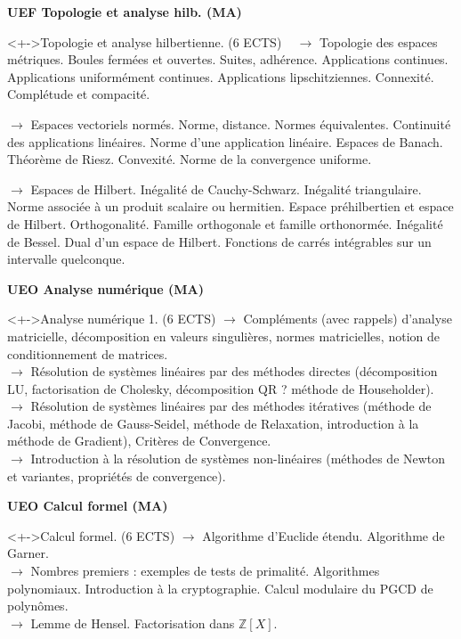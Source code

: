 \documentclass{beamer}
\begin{document}
\begin{frame}
{\bf UEF Topologie et analyse hilb. (MA)}
\begin{block}<+->{Topologie et analyse hilbertienne.  (6 ECTS) \ } 
$\to$ Topologie des espaces métriques.   Boules fermées et ouvertes. Suites,  adhérence.   Applications continues. Applications uniformément continues.
Applications lipschitziennes. Connexité. Complétude et compacité.  

$\to$ Espaces vectoriels normés. Norme, distance. Normes équivalentes.  
Continuité des applications linéaires. Norme d'une application linéaire. Espaces de Banach.
Théorème de Riesz. Convexité. Norme de la convergence uniforme.  

$\to$ Espaces de Hilbert. Inégalité de Cauchy-Schwarz. Inégalité triangulaire. Norme associée à
un produit scalaire ou hermitien. Espace préhilbertien et espace de Hilbert. Orthogonalité.
Famille orthogonale et famille orthonormée. Inégalité de Bessel. Dual d'un espace de
Hilbert. Fonctions de carrés intégrables sur un intervalle quelconque.  

 
\end{block}
\end{frame}

 


\begin{frame}
{\bf UEO  Analyse numérique (MA)   }
\begin{block}<+->{Analyse numérique 1.  (6 ECTS)} 
 $\to$ Compléments (avec rappels) d'analyse matricielle, décomposition en valeurs singulières,
normes matricielles, notion de conditionnement de matrices.\\
$\to$ Résolution de systèmes linéaires par des méthodes directes (décomposition LU,
factorisation de Cholesky, décomposition QR ? méthode de Householder).\\
$\to$ Résolution de systèmes linéaires par des méthodes itératives (méthode de Jacobi,
méthode de Gauss-Seidel, méthode de Relaxation, introduction à la méthode de Gradient),
Critères de Convergence.\\
$\to$ Introduction à la résolution de systèmes non-linéaires (méthodes de Newton et variantes,
propriétés de convergence). 
\end{block}
 
\end{frame}


\begin{frame}
{\bf UEO Calcul formel  (MA) }
\begin{block}<+->{Calcul formel.   (6 ECTS)} 
$\to$ Algorithme d'Euclide étendu. Algorithme de Garner.\\
$\to$ Nombres premiers : exemples de tests de primalité. Algorithmes polynomiaux. Introduction à
la cryptographie. Calcul modulaire du PGCD de polynômes.\\
$\to$ Lemme de Hensel. Factorisation dans $\mathbb{Z}[X]$. 
\end{block}
\end{frame}
\end{document}
